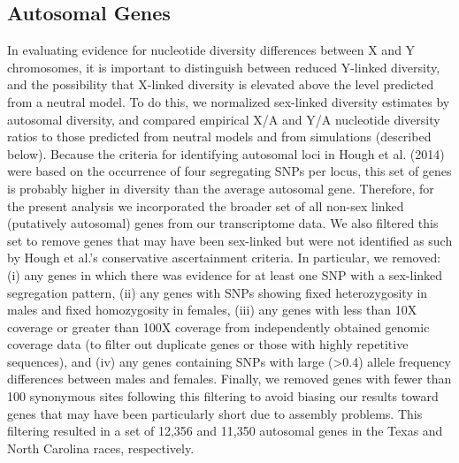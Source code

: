 \documentclass[9pt,twocolumn,twoside]{gsajnl}
\begin{document}
\subsection*{Autosomal Genes}
In evaluating evidence for nucleotide diversity differences between X and Y chromosomes, it is important to distinguish between reduced Y-linked diversity, and the possibility that X-linked diversity is elevated above the level predicted from a neutral model. To do this, we normalized sex-linked diversity estimates by autosomal diversity, and compared empirical X/A and Y/A nucleotide diversity ratios to those predicted from neutral models and from simulations (described below). Because the criteria for identifying autosomal loci in Hough et al. (2014) were based on the occurrence of four segregating SNPs per locus, this set of genes is probably higher in diversity than the average autosomal gene. Therefore, for the present analysis we incorporated the broader set of all non-sex linked (putatively autosomal) genes from our transcriptome data. We also filtered this set to remove genes that may have been sex-linked but were not identified as such by Hough et al.'s conservative ascertainment criteria. In particular, we removed: (i) any genes in which there was evidence for at least one SNP with a sex-linked segregation pattern, (ii) any genes with SNPs showing fixed heterozygosity in males and fixed homozygosity in females, (iii) any genes with less than 10X coverage or greater than 100X coverage from independently obtained genomic coverage data (to filter out duplicate genes or those with highly repetitive sequences), and (iv) any genes containing SNPs with large (>0.4) allele frequency differences between males and females. Finally, we removed genes with fewer than 100 synonymous sites following this filtering to avoid biasing our results toward genes that may have been particularly short due to assembly problems. This filtering resulted in a set of 12,356 and 11,350 autosomal genes in the Texas and North Carolina races, respectively.
\end{document}
